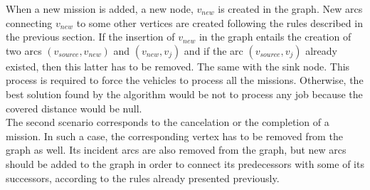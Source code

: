 \documentclass[review]{elsarticle}
\begin{document}
When a new mission is added, a new node, $v_{new}$ is created in the graph. New arcs connecting $v_{new}$ to some other vertices are created following the rules described in the previous section. If the insertion of $v_{new}$ in the graph entails the creation of two arcs $(v_{source},v_{new})$ and $(v_{new},v_j)$ and if the arc $(v_{source},v_j)$ already existed, then this latter has to be removed. The same with the sink node. This process is required to force the vehicles to process all the missions. Otherwise, the best solution found by the algorithm would be not to process any job because the covered distance would be null.\\


The second scenario corresponds to the cancelation or the completion of a mission. In such a case, the corresponding vertex has to be removed from the graph as well. Its incident arcs are also removed from the graph, but new arcs should be added to the graph in order to connect its predecessors with some of its successors, according to the rules already presented previously. 
\end{document}
